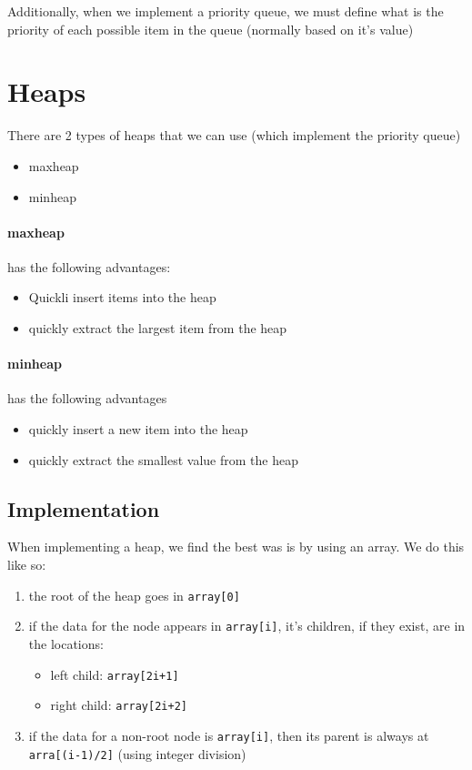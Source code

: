 \documentclass[12pt]{book}
\begin{document}
Additionally, when we implement a priority queue, we must define what is the priority 
of each possible item in the queue (normally based on it's value)

\section*{Heaps}
There are 2 types of heaps that we can use (which implement the priority queue)
\begin{itemize}
        \item maxheap
        \item minheap
\end{itemize}
\paragraph{maxheap} has the following advantages:
\begin{itemize}
        \item Quickli insert items into the heap
        \item quickly extract the largest item from the heap
\end{itemize}

\paragraph{minheap} has the following advantages
\begin{itemize}
        \item quickly insert a new item into the heap
        \item quickly extract the smallest value from the heap
\end{itemize}

\subsection*{Implementation}
When implementing a heap, we find the best was is by using an array.
We do this like so:
\begin{enumerate}
        \item the root of the heap goes in \texttt{array[0]}
        \item if the data for the node appears in \texttt{array[i]}, it's children, if they exist, are in the locations:
                \begin{itemize}
                        \item left child: \texttt{array[2i+1]}
                        \item right child: \texttt{array[2i+2]}
                \end{itemize}
        \item if the data for a non-root node is \texttt{array[i]}, then its parent is always at \texttt{arra[(i-1)/2]} (using integer division)
\end{enumerate}
\end{document}
